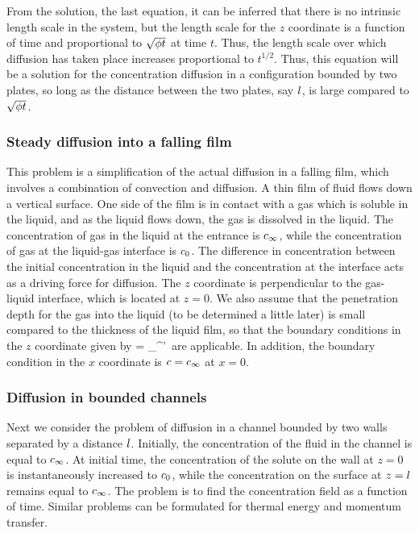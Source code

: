 From the solution, the last equation, it can be inferred that there is no intrinsic length scale in the system, but the length scale for the $z$ coordinate is a function of time and proportional to $\sqrt{\phi t}$ at time $t$. Thus, the length scale over which diffusion has taken place increases proportional to $t^{1/2}$. Thus, this equation will be a solution for the concentration diffusion in a configuration bounded by two plates, so long as the distance between the two plates, say $l$, is large compared to $\sqrt{\phi t}$.


\subsubsection{Steady diffusion into a falling film}
This problem is a simplification of the actual diffusion in a falling film, which involves a combination of convection and diffusion. A thin film of fluid flows down a vertical surface. One side of the film is in contact with a gas which is soluble in the liquid, and as the liquid flows down, the gas is dissolved in the liquid. The concentration of gas in the liquid at the entrance is $c_\infty$, while the concentration of gas at the liquid-gas interface is $c_0$. The difference in concentration between the initial concentration in the liquid and the concentration at the interface acts as a driving force for diffusion. The $z$ coordinate is perpendicular to the gas-liquid interface, which is located at $z = 0$. We also assume that the penetration depth for the gas into the liquid (to be determined a little later) is small compared to the thickness of the liquid film, so that the boundary conditions in the $z$ coordinate given by
\beq
\scpq\conc\vat\kdim = \int_{\kdim}^{\infty}\dx\kdim'\,\exp{}
\eeq
are applicable. In addition, the boundary condition in the $x$ coordinate is $c = c_\infty$ at $x = 0$.


\subsubsection{Diffusion in bounded channels}
Next we consider the problem of diffusion in a channel bounded by two walls separated by a distance $l$. Initially, the concentration of the fluid in the channel is equal to $c_\infty$. At initial time, the concentration of the solute on the wall at $z = 0$ is instantaneously increased to $c_0$, while the concentration on the surface at $z = l$ remains equal to $c_\infty$. The problem is to find the concentration field as a function of time. Similar problems can be formulated for thermal energy and momentum transfer.

